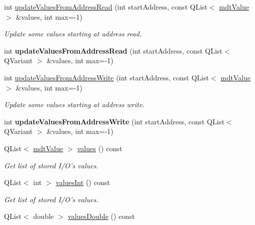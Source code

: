 \begin{DoxyCompactItemize}
\item 
int \hyperlink{classmdt_device_ios_segment_af51f263e2a0f5db725cad4b867339cdf}{updateValuesFromAddressRead} (int startAddress, const QList$<$ \hyperlink{classmdt_value}{mdtValue} $>$ \&values, int max=-\/1)
\begin{DoxyCompactList}\small\item\em Update some values starting at address read. \end{DoxyCompactList}\item 
\hypertarget{classmdt_device_ios_segment_a521ec9f8fb527d1e95fc16ae87337a12}{
int {\bfseries updateValuesFromAddressRead} (int startAddress, const QList$<$ QVariant $>$ \&values, int max=-\/1)}
\label{classmdt_device_ios_segment_a521ec9f8fb527d1e95fc16ae87337a12}

\item 
int \hyperlink{classmdt_device_ios_segment_ae99f379be2908bd3d9774ddcb81bfbb0}{updateValuesFromAddressWrite} (int startAddress, const QList$<$ \hyperlink{classmdt_value}{mdtValue} $>$ \&values, int max=-\/1)
\begin{DoxyCompactList}\small\item\em Update some values starting at address write. \end{DoxyCompactList}\item 
\hypertarget{classmdt_device_ios_segment_a06def14996b18b6dcaacaccd8b71f068}{
int {\bfseries updateValuesFromAddressWrite} (int startAddress, const QList$<$ QVariant $>$ \&values, int max=-\/1)}
\label{classmdt_device_ios_segment_a06def14996b18b6dcaacaccd8b71f068}

\item 
\hypertarget{classmdt_device_ios_segment_a563da954d00404fbdaf45ea60a84b532}{
QList$<$ \hyperlink{classmdt_value}{mdtValue} $>$ \hyperlink{classmdt_device_ios_segment_a563da954d00404fbdaf45ea60a84b532}{values} () const }
\label{classmdt_device_ios_segment_a563da954d00404fbdaf45ea60a84b532}

\begin{DoxyCompactList}\small\item\em Get list of stored I/O's values. \end{DoxyCompactList}\item 
\hypertarget{classmdt_device_ios_segment_ad47f742a73846f86ab02c87f481a289d}{
QList$<$ int $>$ \hyperlink{classmdt_device_ios_segment_ad47f742a73846f86ab02c87f481a289d}{valuesInt} () const }
\label{classmdt_device_ios_segment_ad47f742a73846f86ab02c87f481a289d}

\begin{DoxyCompactList}\small\item\em Get list of stored I/O's values. \end{DoxyCompactList}\item 
\hypertarget{classmdt_device_ios_segment_abe79a9a7237ac22dd8bf619838225c4f}{
QList$<$ double $>$ \hyperlink{classmdt_device_ios_segment_abe79a9a7237ac22dd8bf619838225c4f}{valuesDouble} () const }
\label{classmdt_device_ios_segment_abe79a9a7237ac22dd8bf619838225c4f}


\end{DoxyCompactItemize}
